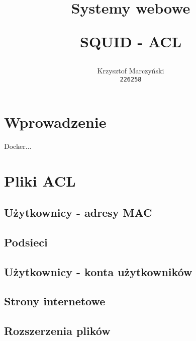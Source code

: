 \documentclass{article}
\title{Systemy webowe\item{SQUID - ACL}}
\author{
\rule[40pt]{0pt}{0pt}
  Krzysztof Marczyński\\
  \texttt{226258}
}
\date{\rule[40pt]{0pt}{0pt} 23.11.2019}
\begin{document}
\maketitle

\newpage

\tableofcontents

\newpage
\section{Wprowadzenie}
Docker...

\section{Pliki ACL}
\subsection{Użytkownicy - adresy MAC}




\subsection{Podsieci}



\subsection{Użytkownicy - konta użytkowników}



\subsection{Strony internetowe}




\subsection{Rozszerzenia plików}




\end{document}
